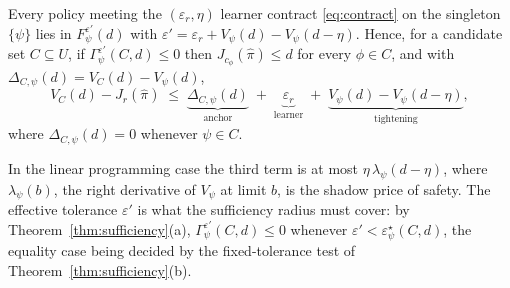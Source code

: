 \begin{theorem}
\label{thm:approx}
Every policy meeting the \((\varepsilon_r,\eta)\) learner contract \eqref{eq:contract}
on the singleton \(\{\psi\}\) lies in \(F^{\varepsilon'}_\psi(d)\) with
\(\varepsilon'=\varepsilon_r+V_\psi(d)-V_\psi(d-\eta)\). Hence, for a candidate set
\(C\subseteq U\), if \(\Gamma^{\varepsilon'}_\psi(C,d)\leq0\) then
\(J_{c_\phi}(\widehat\pi)\leq d\) for every \(\phi\in C\), and with
\(\Delta_{C,\psi}(d)=V_C(d)-V_\psi(d)\),
\[
V_C(d)-J_r(\widehat\pi)\;\leq\;\underbrace{\Delta_{C,\psi}(d)}_{\text{anchor}}
\;+\;\underbrace{\varepsilon_r}_{\text{learner}}
\;+\;\underbrace{V_\psi(d)-V_\psi(d-\eta)}_{\text{tightening}} ,
\]
where \(\Delta_{C,\psi}(d)=0\) whenever \(\psi\in C\).
\end{theorem}
In the linear programming case the third term is at most \(\eta\,\lambda_\psi(d-\eta)\), where
\(\lambda_\psi(b)\), the right derivative of \(V_\psi\) at limit \(b\), is the shadow price of
safety. The effective tolerance \(\varepsilon'\) is what the sufficiency radius must cover: by
Theorem~\ref{thm:sufficiency}(a), \(\Gamma^{\varepsilon'}_\psi(C,d)\le0\) whenever
\(\varepsilon'<\varepsilon^\star_\psi(C,d)\), the equality case being decided by the
fixed-tolerance test of Theorem~\ref{thm:sufficiency}(b).
